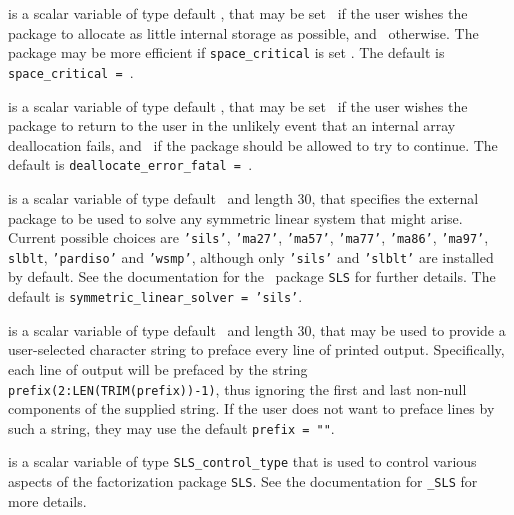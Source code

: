 \documentclass{galahad}
\begin{document}
\begin{description}
 is a scalar variable of type default \logical, that
may be set \true\ if the user wishes the package to allocate as little
internal storage as possible, and \false\ otherwise. The package may
be more efficient if {\tt space\_critical} is set \false.
The default is {\tt space\_critical = \false}.

 is a scalar variable of type default \logical,
that may be set \true\ if the user wishes the package to return to the user
in the unlikely event that an internal array deallocation fails,
and \false\ if the package should be allowed to try to continue.
The default is {\tt deallocate\_error\_fatal = \false}.

 is a scalar variable of type default \character\
and length 30, that specifies the external package to be used to
solve any symmetric linear system that might arise. Current possible
choices are {\tt 'sils'}, {\tt 'ma27'}, {\tt 'ma57'}, {\tt 'ma77'},
{\tt 'ma86'}, {\tt 'ma97'}, {\tt slblt}, {\tt 'pardiso'}
and {\tt 'wsmp'},
although only {\tt 'sils'} and {\tt 'slblt'} are installed by default.
See the documentation for the \galahad\ package {\tt SLS} for further details.
The default is {\tt symmetric\_linear\_solver = 'sils'}.

 is a scalar variable of type default \character\
and length 30, that may be used to provide a user-selected
character string to preface every line of printed output.
Specifically, each line of output will be prefaced by the string
{\tt prefix(2:LEN(TRIM(prefix))-1)},
thus ignoring the first and last non-null components of the
supplied string. If the user does not want to preface lines by such
a string, they may use the default {\tt prefix = ""}.

 is a scalar variable of type
{\tt SLS\_control\_type} that is used to control various aspects of the
factorization package {\tt SLS}. See the documentation for
{\tt \libraryname\_SLS} for more details.

\end{description}

\end{document}
